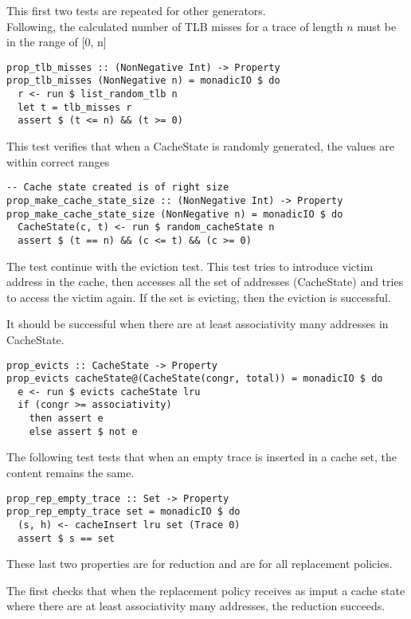 \documentclass[11pt]{article}
\begin{document}
This first two tests are repeated for other generators.\\

Following, the calculated number of TLB misses for a trace of length $n$ must be in the range of [0, n]

\begin{verbatim}
prop_tlb_misses :: (NonNegative Int) -> Property
prop_tlb_misses (NonNegative n) = monadicIO $ do
  r <- run $ list_random_tlb n
  let t = tlb_misses r
  assert $ (t <= n) && (t >= 0)
\end{verbatim}

This test verifies that when a CacheState is randomly generated, the values are within correct ranges
\begin{verbatim}
-- Cache state created is of right size
prop_make_cache_state_size :: (NonNegative Int) -> Property
prop_make_cache_state_size (NonNegative n) = monadicIO $ do
  CacheState(c, t) <- run $ random_cacheState n
  assert $ (t == n) && (c <= t) && (c >= 0)
\end{verbatim}

The test continue with the eviction test. This test tries to introduce victim address in the cache, then accesses all the set of addresses (CacheState) and tries to access the victim again. If the set is evicting, then the eviction is successful.

It should be successful when there are at least associativity many addresses in CacheState.
\begin{verbatim}
prop_evicts :: CacheState -> Property
prop_evicts cacheState@(CacheState(congr, total)) = monadicIO $ do
  e <- run $ evicts cacheState lru
  if (congr >= associativity)
    then assert e
    else assert $ not e  
\end{verbatim}

The following test tests that when an empty trace is inserted in a cache set, the content remains the same.
\begin{verbatim}
prop_rep_empty_trace :: Set -> Property
prop_rep_empty_trace set = monadicIO $ do
  (s, h) <- cacheInsert lru set (Trace 0)
  assert $ s == set
\end{verbatim}

These last two properties are for reduction and are for all replacement policies.

The first checks that when the replacement policy receives as imput a cache state where there are at least associativity many addresses, the reduction succeeds.
\end{document}
